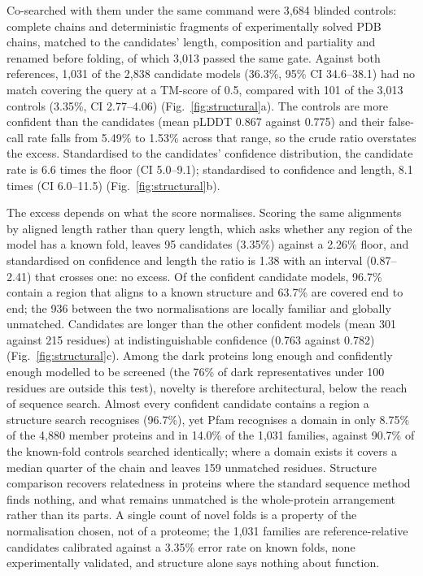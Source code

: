 \documentclass[11pt]{article}
\begin{document}
Co-searched with them under the same command were 3{,}684 blinded controls: complete chains and
deterministic fragments of experimentally solved PDB chains, matched to the candidates' length,
composition and partiality and renamed before folding, of which 3{,}013 passed the same gate.
Against both references, 1{,}031 of the 2{,}838 candidate models (36.3\%, 95\% CI 34.6--38.1) had
no match covering the query at a TM-score of 0.5, compared with 101 of the 3{,}013 controls (3.35\%,
CI 2.77--4.06) (Fig.~\ref{fig:structural}a). The controls are more confident than the candidates
(mean pLDDT 0.867 against 0.775) and their false-call rate falls from 5.49\% to 1.53\% across that
range, so the crude ratio overstates the excess. Standardised to the candidates' confidence
distribution, the candidate rate is 6.6 times the floor (CI 5.0--9.1); standardised to confidence and
length, 8.1 times (CI 6.0--11.5) (Fig.~\ref{fig:structural}b).

The excess depends on what the score normalises. Scoring the same alignments by aligned length
rather than query length, which asks whether any region of the model has a known fold, leaves 95
candidates (3.35\%) against a 2.26\% floor, and standardised on confidence and length the ratio is
1.38 with an interval (0.87--2.41) that crosses one: no excess. Of the confident candidate models,
96.7\% contain a region that aligns to a known structure and 63.7\% are covered end to end; the 936
between the two normalisations are locally familiar and globally unmatched. Candidates are longer
than the other confident models (mean 301 against 215 residues) at indistinguishable confidence
(0.763 against 0.782) (Fig.~\ref{fig:structural}c). Among the dark proteins long enough and
confidently enough modelled to be screened (the 76\% of dark representatives under 100 residues are
outside this test), novelty is therefore architectural, below the reach of sequence search. Almost
every confident candidate contains a
region a structure search recognises (96.7\%), yet Pfam recognises a domain in only 8.75\% of the
4{,}880 member proteins and in 14.0\% of the 1{,}031 families, against 90.7\% of the known-fold
controls searched identically; where a domain exists it covers a median quarter of the chain and
leaves 159 unmatched residues. Structure comparison recovers relatedness in proteins where the
standard sequence method finds nothing, and what remains unmatched is the whole-protein arrangement
rather than its parts. A single count of novel folds is a property of the normalisation chosen, not
of a proteome; the 1{,}031 families are reference-relative candidates calibrated against a 3.35\%
error rate on known folds, none experimentally validated, and structure alone says nothing about
function.
\end{document}
